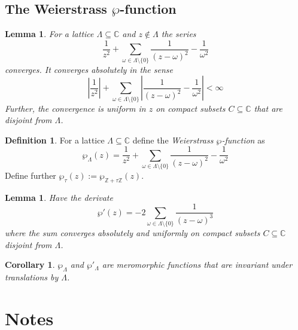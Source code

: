 \documentclass{scrartcl}
\newcommand{\Z}{\mathbb{Z}}
\newcommand{\C}{\mathbb{C}}
\newtheorem{lemma}[prop]{Lemma}
\newtheorem{corollary}[prop]{Corollary}
\theoremstyle{definition}
\newtheorem{definition}[prop]{Definition}
\begin{document}
\subsection{The Weierstrass $\wp$-function}
\begin{lemma}
    For a lattice $\Lambda \subseteq \C$ and $z \notin \Lambda$ the series
    \begin{equation*}
        \frac 1 {z^2} + \sum_{\omega \in \Lambda \setminus \{0\}} \frac 1 {(z - \omega)^2} - \frac 1 {\omega^2}
    \end{equation*}
    converges.
    It converges absolutely in the sense
    \begin{equation*}
        \left| \frac 1 {z^2} \right| + \sum_{\omega \in \Lambda \setminus \{0\}} \left| \frac 1 {(z - \omega)^2} - \frac 1 {\omega^2} \right| < \infty
    \end{equation*}
    Further, the convergence is uniform in $z$ on compact subsets $C \subseteq \C$ that are disjoint from $\Lambda$.
\end{lemma}
\begin{definition}
    For a lattice $\Lambda \subseteq \C$ define the \emph{Weierstrass $\wp$-function} as
    \begin{equation*}
        \wp_\Lambda(z) = \frac 1 {z^2} + \sum_{\omega \in \Lambda \setminus \{0\}} \frac 1 {(z - \omega)^2} - \frac 1 {\omega^2}
    \end{equation*}
    Define further $\wp_{\tau}(z) := \wp_{\Z + \tau\Z}(z)$.
\end{definition}
\begin{lemma}
    Have the derivate
    \begin{equation*}
        \wp'(z) = -2\sum_{\omega \in \Lambda \setminus \{0\}} \frac 1 {(z - \omega)^3}
    \end{equation*}
    where the sum converges absolutely and uniformly on compact subsets $C \subseteq \C$ disjoint from $\Lambda$.
\end{lemma}
\begin{corollary}
    $\wp_\Lambda$ and $\wp'_\Lambda$ are meromorphic functions that are invariant under translations by $\Lambda$.
\end{corollary}

\section*{Notes}
\end{document}
